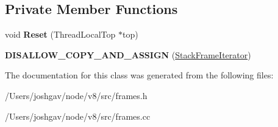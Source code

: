 \subsection*{Private Member Functions}
\begin{DoxyCompactItemize}
\item 
void {\bfseries Reset} (Thread\+Local\+Top $\ast$top)\hypertarget{classv8_1_1internal_1_1_stack_frame_iterator_aac542bb69d74a688b6f86b1422b208b5}{}\label{classv8_1_1internal_1_1_stack_frame_iterator_aac542bb69d74a688b6f86b1422b208b5}

\item 
{\bfseries D\+I\+S\+A\+L\+L\+O\+W\+\_\+\+C\+O\+P\+Y\+\_\+\+A\+N\+D\+\_\+\+A\+S\+S\+I\+GN} (\hyperlink{classv8_1_1internal_1_1_stack_frame_iterator}{Stack\+Frame\+Iterator})\hypertarget{classv8_1_1internal_1_1_stack_frame_iterator_a759e2040f5ae92851d3ee1bba235c451}{}\label{classv8_1_1internal_1_1_stack_frame_iterator_a759e2040f5ae92851d3ee1bba235c451}

\end{DoxyCompactItemize}


The documentation for this class was generated from the following files\+:\begin{DoxyCompactItemize}
\item 
/\+Users/joshgav/node/v8/src/frames.\+h\item 
/\+Users/joshgav/node/v8/src/frames.\+cc\end{DoxyCompactItemize}
